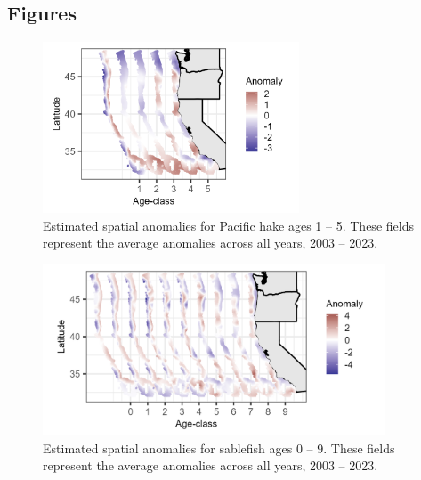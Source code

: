 \documentclass[
]{article}
\begin{document}
\break
\clearpage

\hypertarget{figures}{%
\subsection{Figures}\label{figures}}

\begin{figure}

{\centering \includegraphics[width=3in,height=\textheight]{plots/hake_spatial_anomaly.png}

}

\caption{\label{fig-hake-spatial-anomaly}Estimated spatial anomalies for
Pacific hake ages 1 -- 5. These fields represent the average anomalies
across all years, 2003 -- 2023.}

\end{figure}

\newpage

\begin{figure}

{\centering \includegraphics[width=4in,height=\textheight]{plots/sablefish-spatial-anomaly.png}

}

\caption{\label{fig-sablefish-spatial-anomaly}Estimated spatial
anomalies for sablefish ages 0 -- 9. These fields represent the average
anomalies across all years, 2003 -- 2023.}

\end{figure}

\newpage
\end{document}
